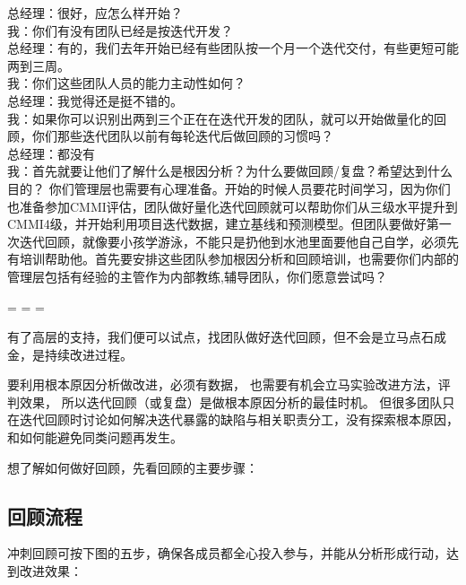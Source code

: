 
总经理：很好，应怎么样开始？\\
我：你们有没有团队已经是按迭代开发？ \\
总经理：有的，我们去年开始已经有些团队按一个月一个迭代交付，有些更短可能两到三周。\\
我：你们这些团队人员的能力主动性如何？\\
总经理：我觉得还是挺不错的。\\
我：如果你可以识别出两到三个正在在迭代开发的团队，就可以开始做量化的回顾，你们那些迭代团队以前有每轮迭代后做回顾的习惯吗？\\
总经理：都没有\\
我：首先就要让他们了解什么是根因分析？为什么要做回顾/复盘？希望达到什么目的？ 你们管理层也需要有心理准备。开始的时候人员要花时间学习，因为你们也准备参加CMMI评估，团队做好量化迭代回顾就可以帮助你们从三级水平提升到CMMI4级，并开始利用项目迭代数据，建立基线和预测模型。但团队要做好第一次迭代回顾，就像要小孩学游泳，不能只是扔他到水池里面要他自己自学，必须先有培训帮助他。首先要安排这些团队参加根因分析和回顾培训，也需要你们内部的管理层包括有经验的主管作为内部教练,辅导团队，你们愿意尝试吗？\\

\begin{description}
\tightlist
\item[]
= = =
\end{description}

有了高层的支持，我们便可以试点，找团队做好迭代回顾，但不会是立马点石成金，是持续改进过程。

要利用根本原因分析做改进，必须有数据， 也需要有机会立马实验改进方法，评判效果， 所以迭代回顾（或复盘）是做根本原因分析的最佳时机。 但很多团队只在迭代回顾时讨论如何解决迭代暴露的缺陷与相关职责分工，没有探索根本原因， 和如何能避免同类问题再发生。

想了解如何做好回顾，先看回顾的主要步骤：

\hypertarget{ux56deux987eux6d41ux7a0b}{%
\subsection{回顾流程}\label{ux56deux987eux6d41ux7a0b}}

冲刺回顾可按下图的五步，确保各成员都全心投入参与，并能从分析形成行动，达到改进效果：\\


